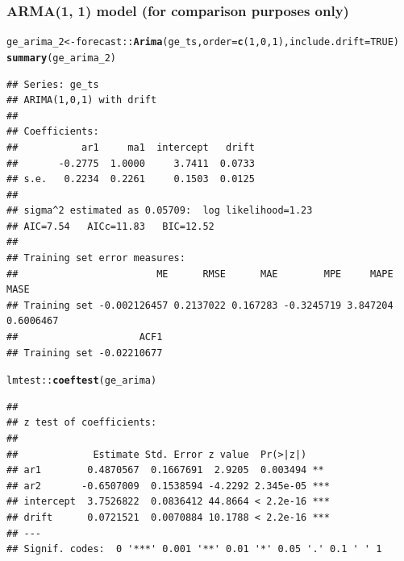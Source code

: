 \documentclass{article}\usepackage[]{graphicx}\usepackage[]{color}
\makeatletter
\newcommand{\hlnum}[1]{\textcolor[rgb]{0.686,0.059,0.569}{#1}}%
\newcommand{\hlopt}[1]{\textcolor[rgb]{0,0,0}{#1}}%
\newcommand{\hlstd}[1]{\textcolor[rgb]{0.345,0.345,0.345}{#1}}%
\newcommand{\hlkwb}[1]{\textcolor[rgb]{0.69,0.353,0.396}{#1}}%
\newcommand{\hlkwc}[1]{\textcolor[rgb]{0.333,0.667,0.333}{#1}}%
\newcommand{\hlkwd}[1]{\textcolor[rgb]{0.737,0.353,0.396}{\textbf{#1}}}%
\newenvironment{kframe}{%
 \def\at@end@of@kframe{}%
 \ifinner\ifhmode%
  \def\at@end@of@kframe{\end{minipage}}%
  \begin{minipage}{\columnwidth}%
 \fi\fi%
 \def\FrameCommand##1{\hskip\@totalleftmargin \hskip-\fboxsep
 \colorbox{shadecolor}{##1}\hskip-\fboxsep
     \hskip-\linewidth \hskip-\@totalleftmargin \hskip\columnwidth}%
 \MakeFramed {\advance\hsize-\width
   \@totalleftmargin\z@ \linewidth\hsize
   \@setminipage}}%
 {\par\unskip\endMakeFramed%
 \at@end@of@kframe}
\newenvironment{knitrout}{}{} %
\makeatother
\begin{document}
\subsubsection*{ARMA(1, 1) model (for comparison purposes only)}
\begin{knitrout}
\color{fgcolor}\begin{kframe}
\begin{alltt}
\hlstd{ge_arima_2} \hlkwb{<-} \hlstd{forecast}\hlopt{::}\hlkwd{Arima}\hlstd{(ge_ts,} \hlkwc{order} \hlstd{=} \hlkwd{c}\hlstd{(}\hlnum{1}\hlstd{,} \hlnum{0}\hlstd{,} \hlnum{1}\hlstd{),} \hlkwc{include.drift} \hlstd{=} \hlnum{TRUE}\hlstd{)}
\hlkwd{summary}\hlstd{(ge_arima_2)}
\end{alltt}
\begin{verbatim}
## Series: ge_ts 
## ARIMA(1,0,1) with drift 
## 
## Coefficients:
##           ar1     ma1  intercept   drift
##       -0.2775  1.0000     3.7411  0.0733
## s.e.   0.2234  0.2261     0.1503  0.0125
## 
## sigma^2 estimated as 0.05709:  log likelihood=1.23
## AIC=7.54   AICc=11.83   BIC=12.52
## 
## Training set error measures:
##                        ME      RMSE      MAE        MPE     MAPE      MASE
## Training set -0.002126457 0.2137022 0.167283 -0.3245719 3.847204 0.6006467
##                     ACF1
## Training set -0.02210677
\end{verbatim}
\begin{alltt}
\hlstd{lmtest}\hlopt{::}\hlkwd{coeftest}\hlstd{(ge_arima)}
\end{alltt}
\begin{verbatim}
## 
## z test of coefficients:
## 
##             Estimate Std. Error z value  Pr(>|z|)    
## ar1        0.4870567  0.1667691  2.9205  0.003494 ** 
## ar2       -0.6507009  0.1538594 -4.2292 2.345e-05 ***
## intercept  3.7526822  0.0836412 44.8664 < 2.2e-16 ***
## drift      0.0721521  0.0070884 10.1788 < 2.2e-16 ***
## ---
## Signif. codes:  0 '***' 0.001 '**' 0.01 '*' 0.05 '.' 0.1 ' ' 1
\end{verbatim}
\end{kframe}
\end{knitrout}
\end{document}
